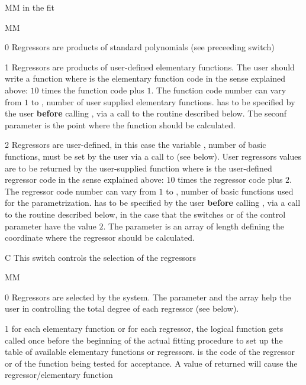 \begin{DLtt}{MM}
in the fit
\begin{DLtt}{MM}
\item[0] Regressors are products of standard polynomials
(see preceeding switch)
\item[1] Regressors are products of user-defined elementary functions.
The user should write a  function 
 where
 is the elementary function code in the sense explained above:
$10$ times the function code plus $1$.
The function code number can vary from $1$ to ,
number of user supplied elementary functions.
 has to be specified by the user {\bf before} calling
, via a call to the routine  described below.
The seconf parameter  is the point where the function should be calculated.
\item[2] Regressors are user-defined, in this case the variable
, number of basic functions, must be set by the user via
a call to  (see below).
User regressors values are to be returned by the
user-supplied  function 
where
 is the user-defined regressor code in the sense explained above:
$10$ times the regressor code plus $2$.
The regressor code number can vary from $1$ to
, number of basic functions used for the parametrization.
 has to be specified by the user {\bf before} calling
, via a call to the routine   described below,
in the case that the switches  or  of the
control parameter  have the value $2$.
The parameter  is an array of length  defining the
coordinate where the regressor should be calculated.
\end{DLtt}
\item[C] This switch controls the selection of the regressors
\begin{DLtt}{MM}
\item[0] Regressors are selected by the system. The parameter
 and the array  help the user in controlling
the total degree of each regressor (see below).
\item[1] for each elementary function or for each regressor,
the logical function 
gets called once before the
beginning of the actual fitting procedure to set up the table of
available elementary functions or regressors.  is
the code of the regressor or of the function being tested for acceptance.
A value of  returned will cause the regressor/elementary function

\end{DLtt}
\end{DLtt}
